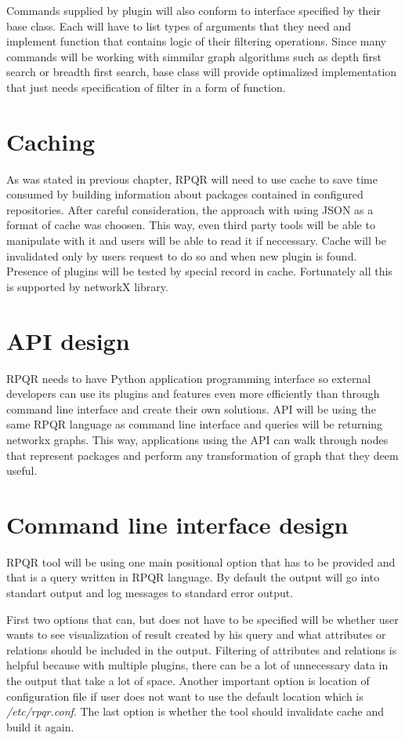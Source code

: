Commands supplied by plugin will also conform to interface specified by their base class. Each
will have to list types of arguments that they need and implement function that contains logic of
their filtering operations. Since many commands will be working with simmilar graph algorithms such as
depth first search or breadth first search, base class will provide optimalized implementation that
just needs specification of filter in a form of function.

\section{Caching}

As was stated in previous chapter, RPQR will need to use cache to save time consumed by building information
about packages contained in configured repositories. After careful consideration, the approach with
using JSON as a format of cache was choosen. This way, even third party tools will be able to manipulate
with it and users will be able to read it if neccessary. Cache will be invalidated only by users
request to do so and when new plugin is found. Presence of plugins will be tested by special record
in cache. Fortunately all this is supported by networkX library.

\section{API design}
RPQR needs to have Python application programming interface so external developers can use its plugins
and features even more efficiently than through command line interface and create their own solutions.
API will be using the same RPQR language as command line interface and queries will be returning
networkx graphs. This way, applications using the API can walk through nodes that represent packages
and perform any transformation of graph that they deem useful.

\newpage

\section{Command line interface design}
RPQR tool will be using one main positional option that has to be provided and that is a query written
in RPQR language. By default the output will go into standart output and log messages to standard error output.

First two options that can, but does not have to be specified will be whether user wants to see visualization
of result created by his query and what attributes or relations should be included in the output.
Filtering of attributes and relations is helpful because with multiple plugins, there can be a lot
of unnecessary data in the output that take a lot of space. Another important option is location
of configuration file if user does not want to use the default location which is \textit{/etc/rpqr.conf}.
The last option is whether the tool should invalidate cache and build it again.


